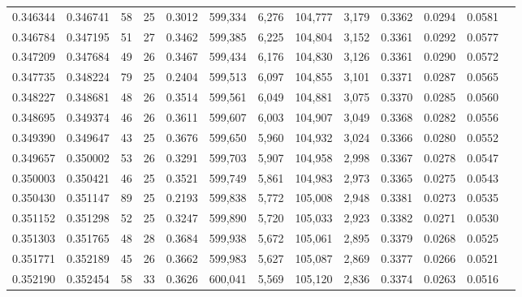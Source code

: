 \begin{tabular}{rrrrrrrrrrrrr}
0.346344 & 0.346741 &  58 &  25 &                                     0.3012 & 599,334 &   6,276 & 104,777 &   3,179 & 0.3362 & 0.0294 & 0.0581 \\
0.346784 & 0.347195 &  51 &  27 &                                     0.3462 & 599,385 &   6,225 & 104,804 &   3,152 & 0.3361 & 0.0292 & 0.0577 \\
0.347209 & 0.347684 &  49 &  26 &                                     0.3467 & 599,434 &   6,176 & 104,830 &   3,126 & 0.3361 & 0.0290 & 0.0572 \\
0.347735 & 0.348224 &  79 &  25 &                                     0.2404 & 599,513 &   6,097 & 104,855 &   3,101 & 0.3371 & 0.0287 & 0.0565 \\
0.348227 & 0.348681 &  48 &  26 &                                     0.3514 & 599,561 &   6,049 & 104,881 &   3,075 & 0.3370 & 0.0285 & 0.0560 \\
0.348695 & 0.349374 &  46 &  26 &                                     0.3611 & 599,607 &   6,003 & 104,907 &   3,049 & 0.3368 & 0.0282 & 0.0556 \\
0.349390 & 0.349647 &  43 &  25 &                                     0.3676 & 599,650 &   5,960 & 104,932 &   3,024 & 0.3366 & 0.0280 & 0.0552 \\
0.349657 & 0.350002 &  53 &  26 &                                     0.3291 & 599,703 &   5,907 & 104,958 &   2,998 & 0.3367 & 0.0278 & 0.0547 \\
0.350003 & 0.350421 &  46 &  25 &                                     0.3521 & 599,749 &   5,861 & 104,983 &   2,973 & 0.3365 & 0.0275 & 0.0543 \\
0.350430 & 0.351147 &  89 &  25 &                                     0.2193 & 599,838 &   5,772 & 105,008 &   2,948 & 0.3381 & 0.0273 & 0.0535 \\
0.351152 & 0.351298 &  52 &  25 &                                     0.3247 & 599,890 &   5,720 & 105,033 &   2,923 & 0.3382 & 0.0271 & 0.0530 \\
0.351303 & 0.351765 &  48 &  28 &                                     0.3684 & 599,938 &   5,672 & 105,061 &   2,895 & 0.3379 & 0.0268 & 0.0525 \\
0.351771 & 0.352189 &  45 &  26 &                                     0.3662 & 599,983 &   5,627 & 105,087 &   2,869 & 0.3377 & 0.0266 & 0.0521 \\
0.352190 & 0.352454 &  58 &  33 &                                     0.3626 & 600,041 &   5,569 & 105,120 &   2,836 & 0.3374 & 0.0263 & 0.0516 \\

\end{tabular}
